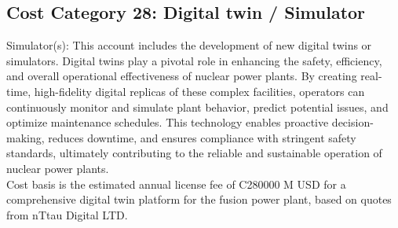 \subsection{Cost Category 28: Digital twin / Simulator }

Simulator(s): This account includes the development of new digital twins or simulators.  Digital twins play a pivotal role in enhancing the safety, efficiency, and overall operational effectiveness of nuclear power plants. By creating real-time, high-fidelity digital replicas of these complex facilities, operators can continuously monitor and simulate plant behavior, predict potential issues, and optimize maintenance schedules. This technology enables proactive decision-making, reduces downtime, and ensures compliance with stringent safety standards, ultimately contributing to the reliable and sustainable 
operation of nuclear power plants.\\

Cost basis is the estimated annual license fee of C280000 M USD for a comprehensive digital twin platform for the fusion power plant, based on quotes from nTtau Digital LTD.
